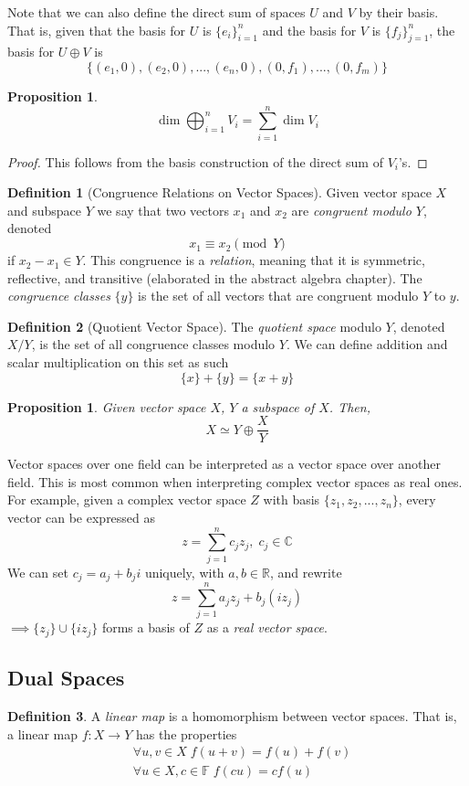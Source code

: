 \documentclass{article}
\newtheorem{proposition}[theorem]{Proposition}
\theoremstyle{remark}
\theoremstyle{definition}
\newtheorem{definition}{Definition}[section]
\begin{document}
Note that we can also define the direct sum of spaces $U$ and $V$ by their basis. That is, given that the basis for $U$ is $\{e_i\}_{i=1}^n$ and the basis for $V$ is $\{f_j\}_{j=1}^n$, the basis for $U \oplus V$ is
\[\{(e_1, 0), (e_2, 0), ..., (e_n, 0), (0, f_1), ..., (0, f_m)\} \]

\begin{proposition}
\[\dim{\bigoplus_{i=1}^n V_i} = \sum_{i=1}^n \dim{V_i}\]
\end{proposition}
\begin{proof}
This follows from the basis construction of the direct sum of $V_i$'s. 
\end{proof}

\begin{definition}[Congruence Relations on Vector Spaces]
Given vector space $X$ and subspace $Y$ we say that two vectors $x_1$ and $x_2$ are \textit{congruent modulo $Y$}, denoted 
\[ x_1 \equiv x_2 \pmod{Y}\]
if $x_2 - x_1 \in Y$. This congruence is a \textit{relation}, meaning that it is symmetric, reflective, and transitive (elaborated in the abstract algebra chapter). The \textit{congruence classes} $\{ y\}$ is the set of all vectors that are congruent modulo $Y$ to $y$. 
\end{definition}

\begin{definition}[Quotient Vector Space]
The \textit{quotient space} modulo $Y$, denoted $ X / Y$, is the set of all congruence classes modulo $Y$. We can define addition and scalar multiplication on this set as such 
\[ \{ x\} + \{ y\} = \{ x + y\}\]
\end{definition}

\begin{proposition}
Given vector space $X$, $Y$ a subspace of $X$. Then, 
\[ X \simeq Y \oplus \frac{X}{Y}\]
\end{proposition}

Vector spaces over one field can be interpreted as a vector space over another field. This is most common when interpreting complex vector spaces as real ones. For example, given a complex vector space $Z$ with basis $\{z_1, z_2, ..., z_n\}$, every vector can be expressed as
\[z = \sum_{j=1}^n c_j z_j, \; c_j \in \mathbb{C}\]
We can set $c_j = a_j + b_j i$ uniquely, with $a, b \in \mathbb{R}$, and rewrite
\[z = \sum_{j=1}^n a_j z_j + b_j (i z_j)\]
$\implies \{ z_j\} \cup \{ i z_j\}$ forms a basis of $Z$ as a \textit{real vector space}. 

\subsection{Dual Spaces}
\begin{definition}
A \textit{linear map} is a homomorphism between vector spaces. That is, a linear map $f: X \longrightarrow Y$ has the properties 
\begin{align*}
    & \forall u, v \in X \; f(u + v) = f(u) + f(v) \\
    & \forall u \in X, c \in \mathbb{F} \; f(c u) = c f(u) 
\end{align*}
\end{definition}
\end{document}
